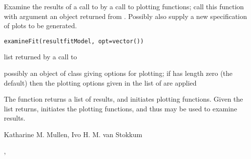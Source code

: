 \begin{Description}\relax
Examine the results of a call to   
by a call to plotting functions; call this function with argument 
an object returned from .  Possibly also supply a new 
specification of plots to be generated.
\end{Description}
\begin{Usage}
\begin{verbatim}
examineFit(resultfitModel, opt=vector())
\end{verbatim}
\end{Usage}
\begin{Arguments}
\begin{ldescription}
\item[\code{resultfitModel}] list returned by a call to  
\item[\code{opt}] possibly an object of class  giving options for 
plotting; if  has length zero (the default) then the plotting
options given in the  list of  are 
applied
\end{ldescription}
\end{Arguments}
\begin{Details}\relax
The   function returns a list of results, and initiates plotting
functions.  Given the  list   returns, 
 initiates the plotting functions, and thus may be 
used to examine results.
\end{Details}
\begin{Author}\relax
Katharine M. Mullen, Ivo H. M. van Stokkum
\end{Author}
\begin{SeeAlso}\relax
{}, 
\end{SeeAlso}

